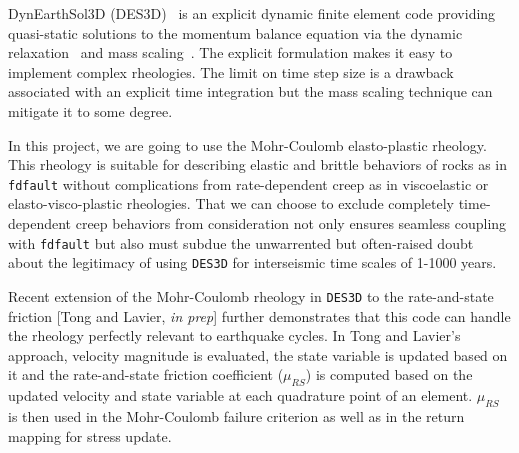 \documentclass[11pt]{article} %
\begin{document}
    

    DynEarthSol3D (DES3D)~\citep{Choi2013,Tan2013,Ta2015,Logan2017} is an explicit dynamic finite element code providing quasi-static solutions to the momentum balance equation via the dynamic relaxation~\citep{Cundall1989} and mass scaling~\citep[e.g.][]{Chung1998}. The explicit formulation makes it easy to implement complex rheologies. The limit on time step size is a drawback associated with an explicit time integration but the mass scaling technique can mitigate it to some degree.
    
    In this project, we are going to use the Mohr-Coulomb elasto-plastic rheology. This rheology is suitable for describing elastic and brittle behaviors of rocks as in \texttt{fdfault} without complications from rate-dependent creep as in viscoelastic or elasto-visco-plastic rheologies. That we can choose to exclude completely time-dependent creep behaviors from consideration not only ensures seamless coupling with \texttt{fdfault} but also must subdue the unwarrented but often-raised doubt about the legitimacy of using \texttt{DES3D} for interseismic time scales of 1-1000 years.
    
    Recent extension of the Mohr-Coulomb rheology in \texttt{DES3D} to the rate-and-state friction [Tong and Lavier, \emph{in prep}] further demonstrates that this code can handle the rheology perfectly relevant to earthquake cycles. In Tong and Lavier's approach, velocity magnitude is evaluated, the state variable is updated based on it and the rate-and-state friction coefficient ($\mu_{RS}$) is computed based on the updated velocity and state variable at each quadrature point of an element. $\mu_{RS}$ is then used in the Mohr-Coulomb failure criterion as well as in the return mapping for stress update. %
    
\end{document}

